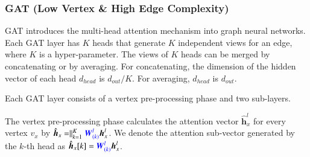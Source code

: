 \subsubsection{GAT (Low Vertex \& High Edge Complexity)}

GAT \cite{huang2018_gat} introduces the multi-head attention mechanism into graph neural networks.
%
Each GAT layer has $K$ heads that generate $K$ independent views for an edge, where $K$ is a hyper-parameter.
%
The views of $K$ heads can be merged by concatenating or by averaging.
%
For concatenating, the dimension of the hidden vector of each head $d_{head}$ is $d_{out}/K$.
%
For averaging, $d_{head}$ is $d_{out}$.

Each GAT layer consists of a vertex pre-processing phase and two sub-layers.

The vertex pre-processing phase calculates the attention vector $\hat{\boldsymbol{h}}^{l}_{x}$ for every vertex $v_x$ by $\hat{\boldsymbol{h}}_{x} = \parallel_{k=1}^K \textcolor{blue}{\boldsymbol{W}^l_{(k)}}\boldsymbol{h}^l_x$. We denote the attention sub-vector generated by the $k$-th head as $\hat{\boldsymbol{h}}_{x}[k]=\textcolor{blue}{\boldsymbol{W}^l_{(k)}}\boldsymbol{h}^l_x$.

